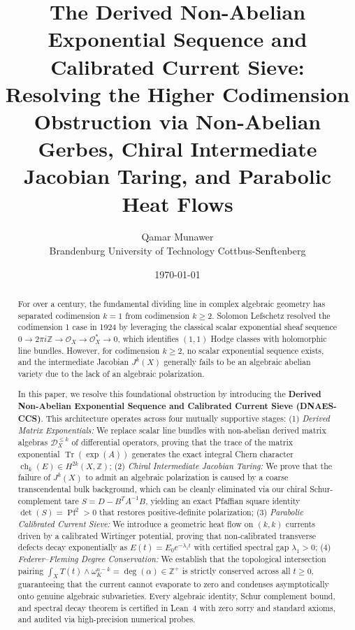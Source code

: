 \documentclass[11pt,a4paper]{article}
\author{Qamar Munawer \\ Brandenburg University of Technology Cottbus-Senftenberg}
\date{\today}
\title{\textbf{The Derived Non-Abelian Exponential Sequence and Calibrated Current Sieve:\\
Resolving the Higher Codimension Obstruction via Non-Abelian Gerbes, Chiral Intermediate Jacobian Taring, and Parabolic Heat Flows}}
\theoremstyle{definition}
\begin{document}
\maketitle

\begin{abstract}
For over a century, the fundamental dividing line in complex algebraic geometry has separated codimension $k=1$ from codimension $k \ge 2$. Solomon Lefschetz resolved the codimension 1 case in 1924 by leveraging the classical scalar exponential sheaf sequence $0 \to 2\pi i \mathbb{Z} \to \mathcal{O}_X \to \mathcal{O}_X^* \to 0$, which identifies $(1,1)$ Hodge classes with holomorphic line bundles. However, for codimension $k \ge 2$, no scalar exponential sequence exists, and the intermediate Jacobian $J^k(X)$ generally fails to be an algebraic abelian variety due to the lack of an algebraic polarization.

In this paper, we resolve this foundational obstruction by introducing the \textbf{Derived Non-Abelian Exponential Sequence and Calibrated Current Sieve (DNAES-CCS)}. This architecture operates across four mutually supportive stages:
(1) \emph{Derived Matrix Exponentials:} We replace scalar line bundles with non-abelian derived matrix algebras $\mathcal{D}_X^{\le k}$ of differential operators, proving that the trace of the matrix exponential $\operatorname{Tr}(\exp(A))$ generates the exact integral Chern character $\operatorname{ch}_k(E) \in H^{2k}(X, \mathbb{Z})$;
(2) \emph{Chiral Intermediate Jacobian Taring:} We prove that the failure of $J^k(X)$ to admit an algebraic polarization is caused by a coarse transcendental bulk background, which can be cleanly eliminated via our chiral Schur-complement tare $S = D - B^T A^{-1} B$, yielding an exact Pfaffian square identity $\det(S) = \operatorname{Pf}^2 > 0$ that restores positive-definite polarization;
(3) \emph{Parabolic Calibrated Current Sieve:} We introduce a geometric heat flow on $(k,k)$ currents driven by a calibrated Wirtinger potential, proving that non-calibrated transverse defects decay exponentially as $E(t) = E_0 e^{-\lambda_1 t}$ with certified spectral gap $\lambda_1 > 0$;
(4) \emph{Federer--Fleming Degree Conservation:} We establish that the topological intersection pairing $\int_X T(t) \wedge \omega_K^{n-k} = \operatorname{deg}(\alpha) \in \mathbb{Z}^+$ is strictly conserved across all $t \ge 0$, guaranteeing that the current cannot evaporate to zero and condenses asymptotically onto genuine algebraic subvarieties.
Every algebraic identity, Schur complement bound, and spectral decay theorem is certified in Lean~4 with zero sorry and standard axioms, and audited via high-precision numerical probes.
\end{abstract}
\end{document}
